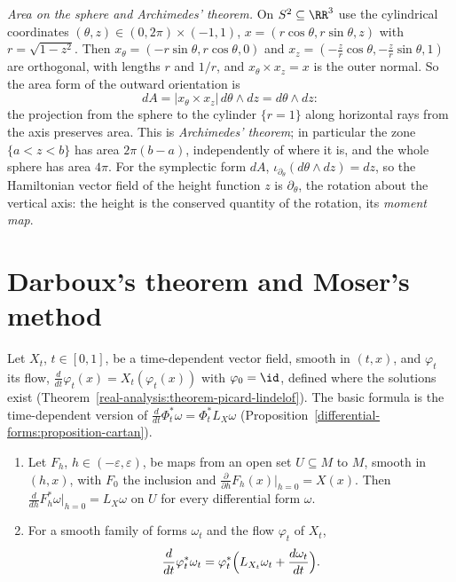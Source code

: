 \begin{example}\label{symplectic-geometry:example-archimedes}
\emph{Area on the sphere and Archimedes' theorem.} On $S^2 \subseteq \RR^3$ use the cylindrical coordinates $(\theta, z) \in (0, 2\pi) \times (-1, 1)$, $x = (r\cos\theta, r\sin\theta, z)$ with $r = \sqrt{1 - z^2}$.
Then $x_\theta = (-r\sin\theta, r\cos\theta, 0)$ and $x_z = (-\frac zr\cos\theta, -\frac zr\sin\theta, 1)$ are orthogonal, with lengths $r$ and $1/r$, and $x_\theta \times x_z = x$ is the outer normal. So
the area form of the outward orientation is
\[
dA = |x_\theta \times x_z|\,d\theta \wedge dz = d\theta \wedge dz :
\]
the projection from the sphere to the cylinder $\{r = 1\}$ along horizontal rays from the axis preserves area. This is \emph{Archimedes' theorem}; in particular the zone $\{a < z < b\}$ has area $2\pi(b - a)$,
independently of where it is, and the whole sphere has area $4\pi$. For the symplectic form $dA$, $\iota_{\partial_\theta}(d\theta \wedge dz) = dz$, so the Hamiltonian vector field of the height function $z$
is $\partial_\theta$, the rotation about the vertical axis: the height is the conserved quantity of the rotation, its \emph{moment map}.
\end{example}

\section{Darboux's theorem and Moser's method}\label{symplectic-geometry:section-darboux}

Let $X_t$, $t \in [0, 1]$, be a time-dependent vector field, smooth in $(t, x)$, and $\varphi_t$ its flow, $\frac{d}{dt}\varphi_t(x) = X_t(\varphi_t(x))$ with $\varphi_0 = \id$, defined where the solutions exist
(Theorem~\ref{real-analysis:theorem-picard-lindelof}). The basic formula is the time-dependent version of $\frac{d}{dt}\Phi_t^*\omega = \Phi_t^*L_X\omega$ (Proposition~\ref{differential-forms:proposition-cartan}).

\begin{lemma}\label{symplectic-geometry:lemma-moser-formula}
\begin{enumerate}
\item Let $F_h$, $h \in (-\varepsilon, \varepsilon)$, be maps from an open set $U \subseteq M$ to $M$, smooth in $(h, x)$, with $F_0$ the inclusion and $\frac{\partial}{\partial h}F_h(x)|_{h=0} = X(x)$. Then
$\frac{d}{dh}F_h^*\omega|_{h=0} = L_X\omega$ on $U$ for every differential form $\omega$.
\item For a smooth family of forms $\omega_t$ and the flow $\varphi_t$ of $X_t$,
\begin{equation}\label{symplectic-geometry:equation-moser}
\frac{d}{dt}\varphi_t^*\omega_t = \varphi_t^*\Bigl(L_{X_t}\omega_t + \frac{d\omega_t}{dt}\Bigr).
\end{equation}
\end{enumerate}
\end{lemma}

